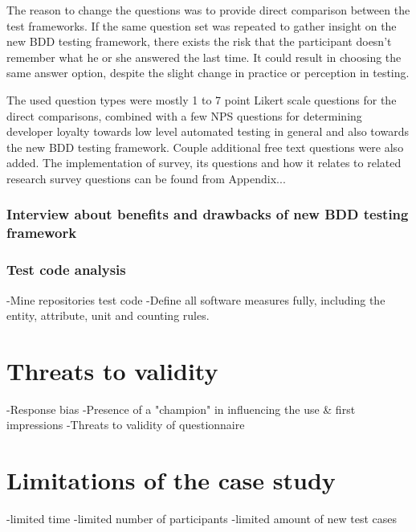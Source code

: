    The reason to change the questions was to provide direct comparison between the test frameworks.
    If the same question set was repeated to gather insight on the new BDD testing framework, there exists the risk that
    the participant doesn't remember what he or she answered the last time. It could result in choosing the same answer option,
    despite the slight change in practice or perception in testing.

    The used question types were mostly 1 to 7 point Likert scale questions for the direct comparisons, combined with a few NPS questions for
    determining developer loyalty towards low level automated testing in general and also towards the new BDD testing framework.
    Couple additional free text questions were also added.
    The implementation of survey, its questions and how it relates to related research survey questions can be found from Appendix...

    \subsubsection{Interview about benefits and drawbacks of new BDD testing framework}

    \subsubsection{Test code analysis}
    -Mine repositories test code\newline
        -Define all software measures fully, including the entity, attribute, unit and counting rules.

\section{Threats to validity}
-Response bias\newline
-Presence of a "champion" in influencing the use & first impressions\newline
-Threats to validity of questionnaire\newline\newline
\section{Limitations of the case study}
-limited time\newline
-limited number of participants\newline
-limited amount of new test cases\newline


